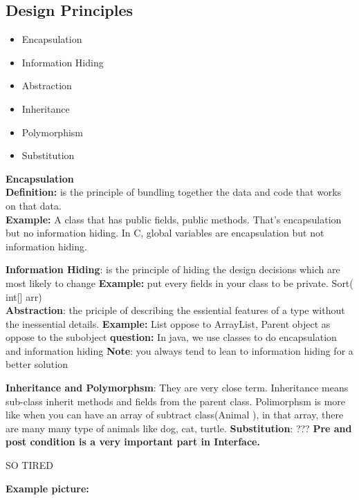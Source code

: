 \documentclass{article}
\begin{document}
\subsection{Design Principles}
\begin{itemize}
  \item Encapsulation
  \item Information Hiding
  \item Abstraction
  \item Inheritance
  \item Polymorphism
  \item Substitution
\end{itemize}

\textbf{Encapsulation}\\
\textbf{Definition:} is the principle of bundling together the data and code
that works on that data.\\
\textbf{Example:} A class that has public fields, public methods. That's
encapsulation but no information hiding. In C, global variables are
encapsulation but not information hiding.

\textbf{Information Hiding}: is the principle of hiding the design decisions
which are most likely to change
\textbf{Example:} put every fields in your class to be private. Sort( int[]
arr)\\
\textbf{Abstraction}: the priciple of describing the essiential features of a
type without the inessential details. 
\textbf{Example:} List oppose to ArrayList, Parent object as oppose to the
subobject
\textbf{question:} In java, we use classes to do encapsulation and information
hiding
\textbf{Note}: you always tend to lean to information hiding for a better
solution

\textbf{Inheritance and Polymorphsm}: They are very close term. Inheritance
means sub-class inherit methods and fields from the parent class. Polimorphsm is
more like when you can have an array of subtract class(Animal ), in that array,
there are many many type of animals like dog, cat, turtle. 
\textbf{Substitution}: ???
\textbf{Pre and post condition is a very important part in Interface.}

\begin{center}
\textsc{\LARGE{ SO TIRED }}
\end{center}

\textbf{Example picture:}



\textbf{}
\end{document}
